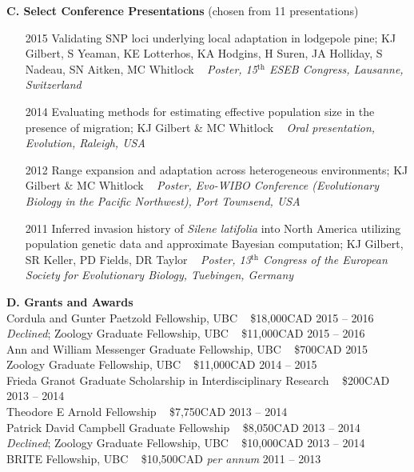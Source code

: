 \noindent \textbf{C.  Select Conference Presentations} (chosen from 11 presentations)
\begin{enumerate}[nolistsep]

\item[2015] Validating SNP loci underlying local adaptation in lodgepole pine; KJ Gilbert, S Yeaman, KE Lotterhos, KA Hodgins, H Suren, JA Holliday, S Nadeau, SN Aitken, MC Whitlock ~ \emph{Poster, 15$^{\textrm{th}}$ ESEB Congress, Lausanne, Switzerland}
	
\item[2014] Evaluating methods for estimating effective population size in the presence of migration; KJ Gilbert \& MC Whitlock ~ \emph{Oral presentation, Evolution, Raleigh, USA}

\item[2012] Range expansion and adaptation across heterogeneous environments; KJ Gilbert \& MC Whitlock ~ \emph{Poster, Evo-WIBO Conference (Evolutionary Biology in the Pacific Northwest), Port Townsend, USA}

\item[2011] Inferred invasion history of \emph{Silene latifolia} into North America utilizing population genetic data and approximate Bayesian computation; KJ Gilbert, SR Keller, PD Fields, DR Taylor ~ \emph{Poster, 13$^{\textrm{th}}$ Congress of the European Society for Evolutionary Biology, Tuebingen, Germany}

\end{enumerate}	
	
\vspace{4pt}	

\noindent
\textbf{D.  Grants and Awards}\\
\textmd{Cordula and Gunter Paetzold Fellowship, UBC ~ \$18,000CAD} \hfill {2015 -- 2016}\\
\textmd{\emph{Declined}; Zoology Graduate Fellowship, UBC ~ \$11,000CAD} \hfill {2015 -- 2016}\\
\textmd{Ann and William Messenger Graduate Fellowship, UBC ~ \$700CAD} \hfill {2015}\\
\textmd{Zoology Graduate Fellowship, UBC ~ \$11,000CAD} \hfill {2014 -- 2015}\\
\textmd{Frieda Granot Graduate Scholarship in Interdisciplinary Research ~ \$200CAD} \hfill {2013 -- 2014}\\
\textmd{Theodore E Arnold Fellowship ~ \$7,750CAD} \hfill {2013 -- 2014}\\
\textmd{Patrick David Campbell Graduate Fellowship ~ \$8,050CAD} \hfill {2013 -- 2014}\\
\textmd{\emph{Declined}; Zoology Graduate Fellowship, UBC ~ \$10,000CAD} \hfill {2013 -- 2014}\\
\textmd{BRITE Fellowship, UBC ~ \$10,500CAD \emph{per annum}} \hfill {2011 -- 2013}\\

